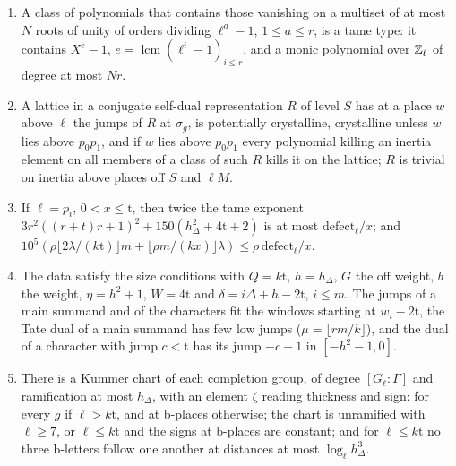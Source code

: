 \begin{lemma}\label{lem:local-lattices}
\begin{enumerate}[label=\textup{(\alph*)}]
\item A class of polynomials that contains those vanishing on a multiset of at most $N$ roots of unity of orders dividing $\ell^a-1$, $1\le a\le r$, is a tame type: it contains $X^e-1$, $e=\operatorname{lcm}(\ell^i-1)_{i\le r}$, and a monic polynomial
over $\mathbb{Z}_\ell$ of degree at most $Nr$.
\item A lattice in a conjugate self-dual representation $R$ of level $S$ has at a place $w$ above $\ell$ the jumps of $R$ at $\sigma_g$, is potentially crystalline, crystalline unless $w$ lies above $p_0p_1$, and if $w$ lies above $p_0p_1$ every
polynomial killing an inertia element on all members of a class of such $R$ kills it on the lattice; $R$ is trivial on inertia above places off $S$ and $\ell M$.
\item If $\ell=p_i$, $0<x\le\mathrm t$, then twice the tame exponent $3r^2((r+t)r+1)^2+150(h_\Delta^2+4\mathrm t+2)$ is at most $\mathrm{defect}_\ell/x$; and $10^5(\rho\lfloor2\lambda/(k\mathrm t)\rfloor m+\lfloor\rho m/(kx)\rfloor\lambda)\le\rho\,\mathrm{defect}_\ell/x$.
\item The data satisfy the size conditions with $Q=k\mathrm t$, $h=h_\Delta$, $G$ the off weight, $b$ the weight, $\eta=h^2+1$, $W=4\mathrm t$ and $\delta=i\Delta+h-2\mathrm t$, $i\le m$. The jumps of a main summand and of the characters fit the windows
starting at $w_i-2\mathrm t$, the Tate dual of a main summand has few low jumps ($\mu=\lfloor r m/k\rfloor$), and the dual of a character with jump $c<\mathrm t$ has its jump $-c-1$ in $[-h^2-1,0]$.
\item There is a Kummer chart of each completion group, of degree $[G_\ell:\Gamma]$ and ramification at most $h_\Delta$, with an element $\zeta$ reading thickness and sign: for every $g$ if $\ell>k\mathrm t$, and at b-places otherwise; the chart is
unramified with $\ell\ge7$, or $\ell\le k\mathrm t$ and the signs at b-places are constant; and for $\ell\le k\mathrm t$ no three b-letters follow one another at distances at most $\log_\ell h_\Delta^3$.
\end{enumerate}
\end{lemma}

